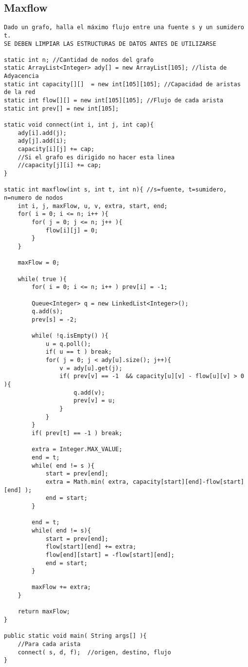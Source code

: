 \documentclass[10pt,letterpaper,twocolumn,twosided]{article}
\begin{document}
\subsection{Maxflow}
\begin{lstlisting}
Dado un grafo, halla el máximo flujo entre una fuente s y un sumidero t.
SE DEBEN LIMPIAR LAS ESTRUCTURAS DE DATOS ANTES DE UTILIZARSE

static int n; //Cantidad de nodos del grafo
static ArrayList<Integer> ady[] = new ArrayList[105]; //lista de Adyacencia
static int capacity[][]  = new int[105][105]; //Capacidad de aristas de la red
static int flow[][] = new int[105][105]; //Flujo de cada arista
static int prev[] = new int[105];

static void connect(int i, int j, int cap){
    ady[i].add(j);
    ady[j].add(i);
    capacity[i][j] += cap;
    //Si el grafo es dirigido no hacer esta linea
    //capacity[j][i] += cap;
}

static int maxflow(int s, int t, int n){ //s=fuente, t=sumidero, n=numero de nodos
    int i, j, maxFlow, u, v, extra, start, end;
    for( i = 0; i <= n; i++ ){
        for( j = 0; j <= n; j++ ){
            flow[i][j] = 0;
        }
    }

    maxFlow = 0;

    while( true ){
        for( i = 0; i <= n; i++ ) prev[i] = -1;

        Queue<Integer> q = new LinkedList<Integer>();
        q.add(s);
        prev[s] = -2;

        while( !q.isEmpty() ){
            u = q.poll();
            if( u == t ) break;
            for( j = 0; j < ady[u].size(); j++){
                v = ady[u].get(j);
                if( prev[v] == -1  && capacity[u][v] - flow[u][v] > 0 ){
                    q.add(v);
                    prev[v] = u;
                }
            }
        }
        if( prev[t] == -1 ) break;

        extra = Integer.MAX_VALUE;
        end = t;
        while( end != s ){
            start = prev[end];
            extra = Math.min( extra, capacity[start][end]-flow[start][end] );
            end = start;
        }

        end = t;
        while( end != s){
            start = prev[end];
            flow[start][end] += extra;
            flow[end][start] = -flow[start][end];
            end = start;
        }

        maxFlow += extra;
    }

    return maxFlow;
}

public static void main( String args[] ){
    //Para cada arista
    connect( s, d, f);  //origen, destino, flujo
}

\end{lstlisting}
\end{document}
